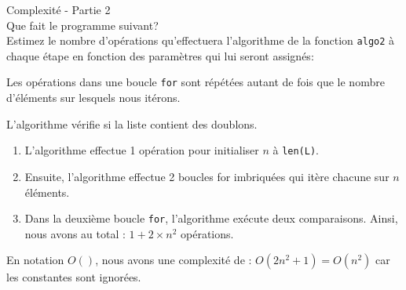 \begin{Exercice}[5 min] Complexité - Partie 2\\
    Que fait le programme suivant? \\
    Estimez le nombre d'opérations qu'effectuera l'algorithme de la fonction \lstinline{algo2} à chaque étape en fonction des paramètres qui lui seront assignés:
    
\begin{conseil}
   Les opérations dans une boucle \lstinline{for} sont répétées autant de fois que le 
   nombre d'éléments sur lesquels nous itérons.
\end{conseil}
    
\begin{solution}
    L'algorithme vérifie si la liste contient des doublons.
    \begin{enumerate}
        \item L'algorithme effectue 1 opération pour initialiser $n$ à \lstinline{len(L)}. 
        \item Ensuite, l'algorithme effectue 2 boucles for imbriquées qui itère chacune sur $n$ éléments. 
        \item Dans la deuxième boucle \lstinline{for}, l'algorithme exécute deux comparaisons. 
        Ainsi, nous avons au total : $1 + 2 \times n^2$ opérations. \\
    \end{enumerate}
    En notation $O()$, nous avons une complexité de : $O(2n^2 + 1) = O(n^2)$ car les constantes sont ignorées. 
       
\end{solution}

\end{Exercice}

